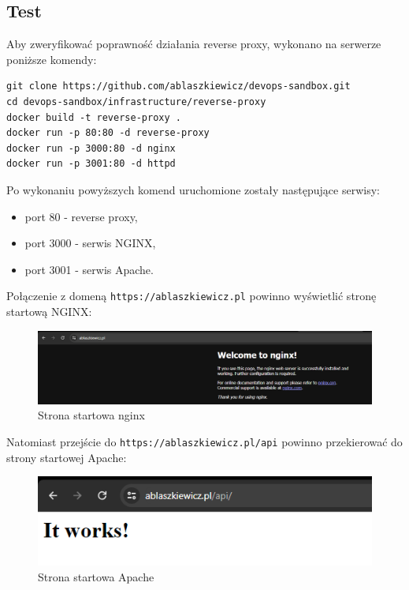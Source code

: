 \documentclass{article}
\begin{document}
\subsection{Test}

Aby zweryfikować poprawność działania reverse proxy, wykonano na serwerze poniższe komendy:

\begin{lstlisting}[caption=Komendy włączające reverse proxy na serwerze]
git clone https://github.com/ablaszkiewicz/devops-sandbox.git
cd devops-sandbox/infrastructure/reverse-proxy
docker build -t reverse-proxy .
docker run -p 80:80 -d reverse-proxy
docker run -p 3000:80 -d nginx
docker run -p 3001:80 -d httpd
\end{lstlisting}

Po wykonaniu powyższych komend uruchomione zostały następujące serwisy:

\begin{itemize}
    \item port 80 - reverse proxy,
    \item port 3000 - serwis NGINX,
    \item port 3001 - serwis Apache.
\end{itemize}

Połączenie z domeną \lstinline|https://ablaszkiewicz.pl| powinno wyświetlić stronę startową NGINX:

\begin{figure}[H]
    \centering
    \includegraphics[width=1\linewidth]{reverseProxyNginx.png}
    \caption{Strona startowa nginx}
    \label{fig:enter-label}
\end{figure}

Natomiast przejście do \lstinline|https://ablaszkiewicz.pl/api| powinno przekierować do strony startowej Apache:

\begin{figure}[H]
    \centering
    \includegraphics[width=1\linewidth]{reverseProxyApache.png}
    \caption{Strona startowa Apache}
    \label{fig:enter-label}
\end{figure}
\end{document}
